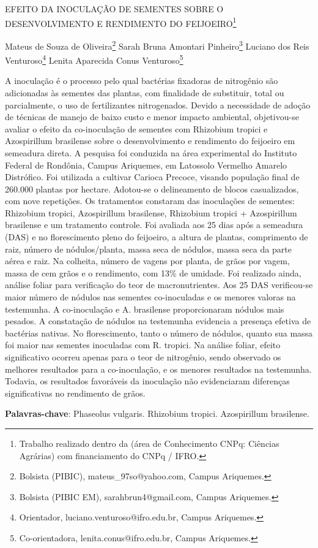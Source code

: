 \documentclass[article,12pt,onesidea,4paper,english,brazil]{abntex2}
\begin{document}
	
	
	\frenchspacing 
	
	\begin{center}
		\LARGE EFEITO DA INOCULAÇÃO DE SEMENTES SOBRE O DESENVOLVIMENTO E
		RENDIMENTO DO FEIJOEIRO\footnote{Trabalho realizado dentro da (área de Conhecimento CNPq: Ciências Agrárias) com financiamento do CNPq / IFRO.}
		
		\normalsize
		Mateus de Souza de Oliveira\footnote{Bolsista (PIBIC), mateus\_97so@yahoo.com, Campus Ariquemes.} 
		Sarah Bruna Amontari Pinheiro\footnote{Bolsista (PIBIC EM), sarahbrun4@gmail.com, Campus Ariquemes.} 
		Luciano dos Reis Venturoso\footnote{Orientador, luciano.venturoso@ifro.edu.br, Campus Ariquemes.} 
		Lenita Aparecida Conus Venturoso\footnote{Co-orientadora, lenita.conus@ifro.edu.br, Campus Ariquemes.} 
	\end{center}
	
	\noindent A inoculação é o processo pelo qual bactérias fixadoras de nitrogênio são
	adicionadas às sementes das plantas, com finalidade de substituir, total ou
	parcialmente, o uso de fertilizantes nitrogenados. Devido a necessidade de adoção
	de técnicas de manejo de baixo custo e menor impacto ambiental, objetivou-se
	avaliar o efeito da co-inoculação de sementes com Rhizobium tropici e Azospirillum
	brasilense sobre o desenvolvimento e rendimento do feijoeiro em semeadura direta.
	A pesquisa foi conduzida na área experimental do Instituto Federal de Rondônia,
	Campus Ariquemes, em Latossolo Vermelho Amarelo Distrófico. Foi utilizada a
	cultivar Carioca Precoce, visando população final de 260.000 plantas por hectare.
	Adotou-se o delineamento de blocos casualizados, com nove repetições. Os
	tratamentos constaram das inoculações de sementes: Rhizobium tropici,
	Azospirillum brasilense, Rhizobium tropici + Azospirillum brasilense e um tratamento
	controle. Foi avaliada aos 25 dias após a semeadura (DAS) e no florescimento pleno
	do feijoeiro, a altura de plantas, comprimento de raiz, número de nódulos/planta,
	massa seca de nódulos, massa seca da parte aérea e raiz. Na colheita, número de
	vagens por planta, de grãos por vagem, massa de cem grãos e o rendimento, com
	13\% de umidade. Foi realizado ainda, análise foliar para verificação do teor de
	macronutrientes. Aos 25 DAS verificou-se maior número de nódulos nas sementes
	co-inoculadas e os menores valoras na testemunha. A co-inoculação e A. brasilense
	proporcionaram nódulos mais pesados. A constatação de nódulos na testemunha
	evidencia a presença efetiva de bactérias nativas. No florescimento, tanto o número
	de nódulos, quanto sua massa foi maior nas sementes inoculadas com R. tropici. Na
	análise foliar, efeito significativo ocorreu apenas para o teor de nitrogênio, sendo
	observado os melhores resultados para a co-inoculação, e os menores resultados na
	testemunha. Todavia, os resultados favoráveis da inoculação não evidenciaram
	diferenças significativas no rendimento de grãos.
	
	\vspace{\onelineskip}
	
	\noindent
	\textbf{Palavras-chave}: Phaseolus vulgaris. Rhizobium tropici. Azospirillum brasilense.
	
\end{document}
